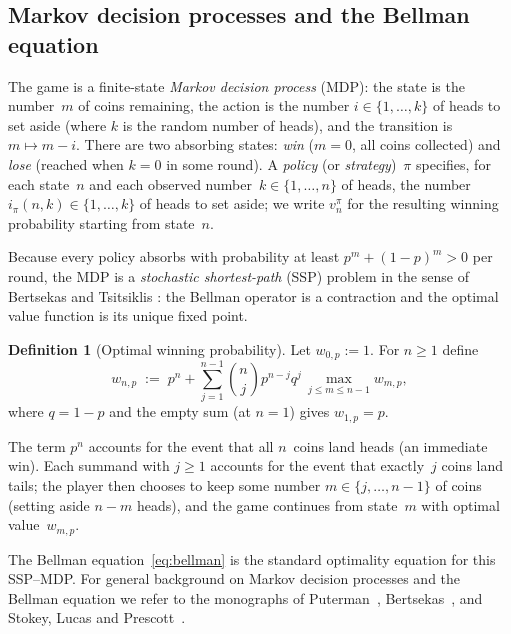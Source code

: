 \documentclass[12pt]{article}
\theoremstyle{definition}
\newtheorem{definition}[theorem]{Definition}
\theoremstyle{remark}
\begin{document}
\subsection{Markov decision processes and the Bellman equation}

The game is a finite-state \emph{Markov decision process} (MDP): the
state is the number~$m$ of coins remaining, the action is the number
$i\in\{1,\dots,k\}$ of heads to set aside (where $k$ is the random
number of heads), and the transition is
$m\mapsto m-i$.  There are two absorbing states: \emph{win}
($m=0$, all coins collected) and \emph{lose} (reached when $k=0$ in
some round).  A \emph{policy} (or \emph{strategy})~$\pi$ specifies,
for each state~$n$ and each observed number~$k\in\{1,\dots,n\}$ of
heads, the number $i_\pi(n,k)\in\{1,\dots,k\}$ of heads to set
aside; we write $v_n^\pi$ for the resulting winning probability
starting from state~$n$.

Because every policy absorbs with probability at least
$p^m+(1-p)^m>0$ per round, the MDP is a \emph{stochastic
shortest-path} (SSP) problem in the sense of Bertsekas and Tsitsiklis
\cite{BertsekisTsitsiklis1991}: the Bellman operator is a contraction
and the optimal value function is its unique fixed point.

\begin{definition}[Optimal winning probability]\label{def:w}
  Let $w_{0,p}:=1$.  For $n\ge 1$ define
  \begin{equation}\label{eq:bellman}
    w_{n,p} \;:=\; p^n + \sum_{j=1}^{n-1}\binom{n}{j}p^{n-j}q^{j}\,
    \max_{j\le m\le n-1} w_{m,p},
  \end{equation}
  where $q=1-p$ and the empty sum (at $n=1$) gives
  $w_{1,p}=p$.
\end{definition}

The term $p^n$ accounts for the event that all $n$~coins land heads
(an immediate win).  Each summand with $j\ge 1$ accounts for the
event that exactly~$j$ coins land tails; the player then chooses to
keep some number $m\in\{j,\dots,n-1\}$ of coins (setting aside
$n-m$ heads), and the game continues from state~$m$ with optimal
value~$w_{m,p}$.

The Bellman equation~\eqref{eq:bellman} is the standard optimality
equation for this SSP--MDP.  For general background on Markov decision
processes and the Bellman equation we refer to the monographs of
Puterman~\cite{Puterman1994}, Bertsekas~\cite{Bertsekas2017}, and
Stokey, Lucas and Prescott~\cite{StokeyLucas1989}.
\end{document}
